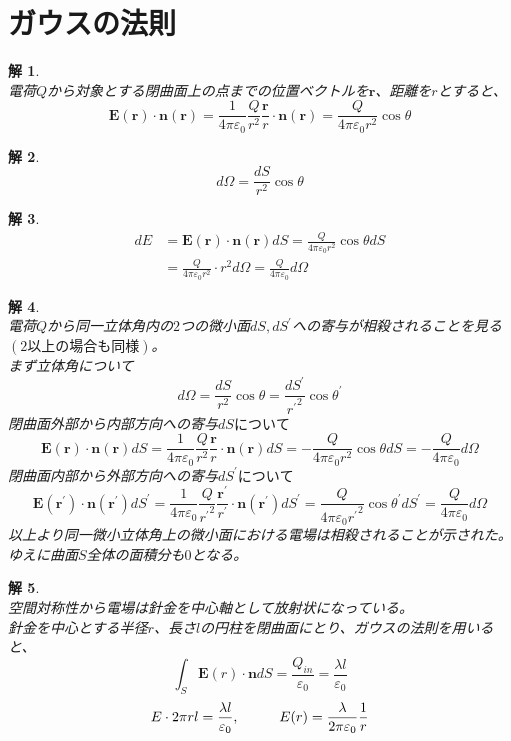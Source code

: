 \documentclass{jsarticle}
\newtheorem{ans}{解}[section]
\begin{document}
\section{ガウスの法則}
\noindent
\begin{ans}~\\
電荷\(Q\)から対象とする閉曲面上の点までの位置ベクトルを\(\bm{r}\)、距離を\(r\)とすると、
\[\bm{E}(\bm{r})\cdot\bm{n}(\bm{r})=\frac{1}{4\pi\varepsilon_{0}}\frac{Q}{r^{2}}\frac{\bm{r}}{r}\cdot\bm{n}(\bm{r})=\frac{Q}{4\pi\varepsilon_{0}r^{2}}\cos\theta\]
\end{ans}

\begin{ans}~\\
\[d\Omega=\frac{dS}{r^{2}}\cos\theta\]
\end{ans}

\begin{ans}~\\
\begin{align*}
dE&=\bm{E}(\bm{r})\cdot\bm{n}(\bm{r})dS=\frac{Q}{4\pi\varepsilon_{0}r^{2}}\cos\theta dS\\
&=\frac{Q}{4\pi\varepsilon_{0}r^{2}}\cdot r^{2}d\Omega=\frac{Q}{4\pi\varepsilon_{0}}d\Omega
\end{align*}
\end{ans}

\begin{ans}~\\
電荷\(Q\)から同一立体角内の\(2\)つの微小面\(dS,dS^{\prime}\)への寄与が相殺されることを見る\((2以上の場合も同様)\)。\\
まず立体角について
\[d\Omega=\frac{dS}{r^{2}}\cos\theta=\frac{dS^{\prime}}{{r^{\prime}}^{2}}\cos\theta^{\prime}\]
閉曲面外部から内部方向への寄与\(dSについて\)
\[\bm{E}(\bm{r})\cdot\bm{n}(\bm{r})dS=\frac{1}{4\pi\varepsilon_{0}}\frac{Q}{r^{2}}\frac{\bm{r}}{r}\cdot\bm{n}(\bm{r})dS=-\frac{Q}{4\pi\varepsilon_{0}r^{2}}\cos\theta dS=-\frac{Q}{4\pi\varepsilon_{0}}d\Omega\]
閉曲面内部から外部方向への寄与\(dS^{\prime}について\)
\[\bm{E}(\bm{r}^{\prime})\cdot\bm{n}(\bm{r}^{\prime})dS^{\prime}=\frac{1}{4\pi\varepsilon_{0}}\frac{Q}{{r^{\prime}}^{2}}\frac{\bm{r}^{\prime}}{r^{\prime}}\cdot\bm{n}(\bm{r}^{\prime})dS^{\prime}=\frac{Q}{4\pi\varepsilon_{0}{r^{\prime}}^{2}}\cos\theta^{\prime}dS^{\prime}=\frac{Q}{4\pi\varepsilon_{0}}d\Omega\]
以上より同一微小立体角上の微小面における電場は相殺されることが示された。ゆえに曲面\(S\)全体の面積分も\(0\)となる。
\end{ans}

\begin{ans}~\\
空間対称性から電場は針金を中心軸として放射状になっている。\\
針金を中心とする半径\(r\)、長さ\(l\)の円柱を閉曲面にとり、ガウスの法則を用いると、
\[\int_{S}\bm{E}(r)\cdot\bm{n}dS=\frac{Q_{in}}{\varepsilon_{0}}=\frac{\lambda l}{\varepsilon_{0}}\]
\[E\cdot2\pi rl=\frac{\lambda l}{\varepsilon_{0}},\hspace{10mm}E(r)=\frac{\lambda}{2\pi\varepsilon_{0}}\frac{1}{r}\]
\end{ans}
\end{document}
